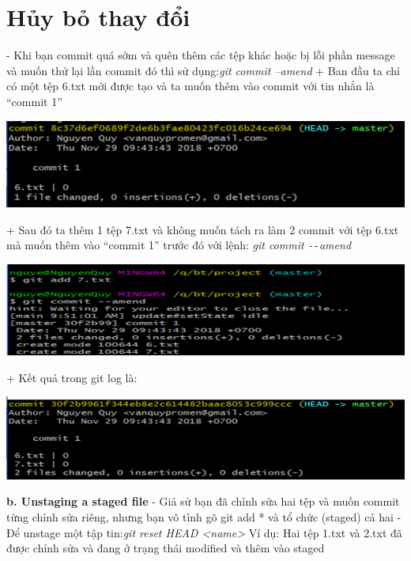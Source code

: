 \documentclass[12pt,a4paper]{report}
\begin{document}
	\label{fig:screenshot025}




	
\section{Hủy bỏ thay đổi}
\hspace{0.6cm}{\bf a. Undoing thing} \vskip 0.4cm
- Khi bạn commit quá sớm và quên thêm các tệp khác hoặc bị lỗi phần message và muốn thử lại lần commit đó thì sử dụng:{\it git commit –amend}\vskip 0.4cm
+ Ban đầu ta chỉ có một tệp 6.txt mới được tạo và ta muốn thêm vào commit với tin nhắn là “commit 1”\vskip 0.4cm

	\includegraphics[width=0.8\linewidth]{screenshot026}

	\label{fig:screenshot026}
\vskip 0.4cm\vskip 0.4cm
+ Sau đó ta thêm 1 tệp 7.txt và không muốn tách ra làm 2 commit với tệp 6.txt mà muốn thêm vào “commit 1” trước đó với lệnh: {\it git commit \texttt{-{}-}amend}\vskip 0.4cm

	\includegraphics[width=0.8\linewidth]{screenshot027}

	\label{fig:screenshot027}
\vskip 0.4cm\vskip 0.4cm
+ Kết quả trong git log là:\vskip 0.4cm

	\includegraphics[width=0.8\linewidth]{screenshot028}
	
	\label{fig:screenshot028}
\vskip 0.4cm\vskip 0.4cm

{\bf b. Unstaging a staged file}\vskip 0.4cm
- Giả sử bạn đã chỉnh sửa hai tệp và muốn commit từng chỉnh sửa riêng, nhưng bạn vô tình gõ git add * và tổ chức (staged) cả hai\vskip 0.4cm
- Để unstage một tập tin:{\it git reset HEAD <name>}\vskip 0.4cm
Ví dụ: Hai tệp 1.txt và 2.txt đã được chỉnh sửa và đang ở trạng thái modified và thêm vào staged\vskip 0.4cm
\end{document}

